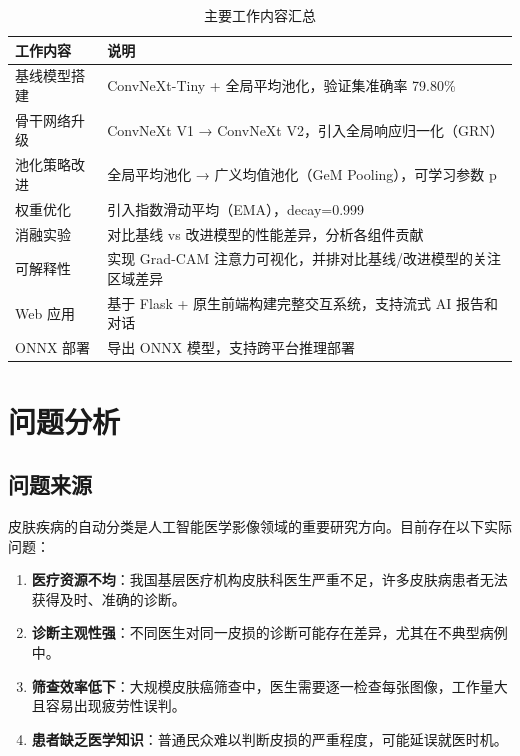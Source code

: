 \documentclass[12pt,a4paper]{report}
\begin{document}
\begin{table}[H]
    \centering
    \caption{主要工作内容汇总}
    \label{tab:main_work}
    \begin{tabularx}{\linewidth}{l X}
        \toprule
        \textbf{工作内容} & \textbf{说明} \\
        \midrule
        基线模型搭建 & ConvNeXt-Tiny + 全局平均池化，验证集准确率 79.80\% \\
        骨干网络升级 & ConvNeXt V1 → ConvNeXt V2，引入全局响应归一化（GRN） \\
        池化策略改进 & 全局平均池化 → 广义均值池化（GeM Pooling），可学习参数 p \\
        权重优化 & 引入指数滑动平均（EMA），decay=0.999 \\
        消融实验 & 对比基线 vs 改进模型的性能差异，分析各组件贡献 \\
        可解释性 & 实现 Grad-CAM 注意力可视化，并排对比基线/改进模型的关注区域差异 \\
        Web 应用 & 基于 Flask + 原生前端构建完整交互系统，支持流式 AI 报告和对话 \\
        ONNX 部署 & 导出 ONNX 模型，支持跨平台推理部署 \\
        \bottomrule
    \end{tabularx}
\end{table}

\chapter{问题分析}

\section{问题来源}

皮肤疾病的自动分类是人工智能医学影像领域的重要研究方向。目前存在以下实际问题：

\begin{enumerate}[leftmargin=2em, itemsep=0.3em]
    \item \textbf{医疗资源不均}：我国基层医疗机构皮肤科医生严重不足，许多皮肤病患者无法获得及时、准确的诊断。
    \item \textbf{诊断主观性强}：不同医生对同一皮损的诊断可能存在差异，尤其在不典型病例中。
    \item \textbf{筛查效率低下}：大规模皮肤癌筛查中，医生需要逐一检查每张图像，工作量大且容易出现疲劳性误判。
    \item \textbf{患者缺乏医学知识}：普通民众难以判断皮损的严重程度，可能延误就医时机。
\end{enumerate}
\end{document}
